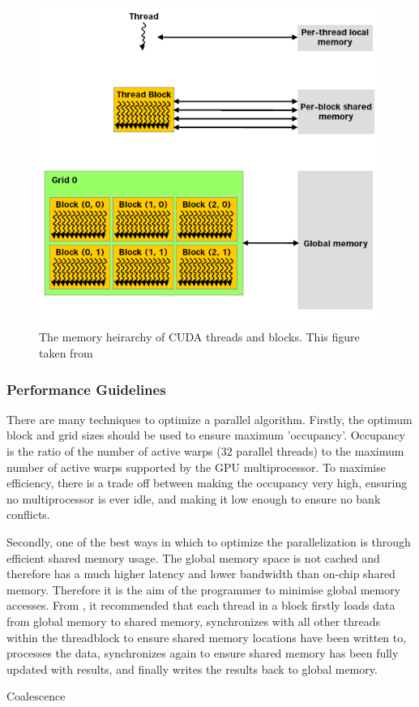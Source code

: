 \begin{figure}[p]
	\centering
		\includegraphics[scale=0.4]{images/cudamemory.PNG}
		\caption{The memory heirarchy of CUDA threads and blocks. This figure taken from \cite{cuda}}
	\label{fig:cudamemory}
\end{figure}

		\subsubsection{Performance Guidelines}
There are many techniques to optimize a parallel algorithm. Firstly, the optimum block and grid sizes should be used to ensure maximum 'occupancy'. Occupancy is the ratio of the number of active warps (32 parallel threads) to the maximum number of active warps supported by the GPU multiprocessor. To maximise efficiency, there is a trade off between making the occupancy very high, ensuring no multiprocessor is ever idle, and making it low enough to ensure no bank conflicts.

Secondly, one of the best ways in which to optimize the parallelization is through efficient shared memory usage. The global memory space is not cached and therefore has a much higher latency and lower bandwidth than on-chip shared memory. Therefore it is the aim of the programmer to minimise global memory accesses. From \cite{cuda}, it recommended that each thread in a block firstly loads data from global memory to shared memory, synchronizes with all other threads within the threadblock to ensure shared memory locations have been written to, processes the data, synchronizes again to ensure shared memory has been fully updated with results, and finally writes the results back to global memory.

Coalescence